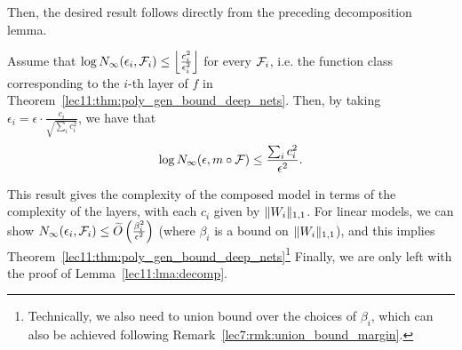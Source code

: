 Then, the desired result follows directly from the preceding decomposition lemma.
\begin{corollary} Assume that $\log N_\infty(\epsilon_i, \mathcal F_i) \leq \left \lfloor \frac{c_i^2}{\epsilon_i^2} \right \rfloor$ for every $\mathcal F_i$, i.e. the function class corresponding to the $i$-th layer of $f$ in Theorem~\ref{lec11:thm:poly_gen_bound_deep_nets}. Then, by taking $\epsilon_i = \epsilon \cdot \frac{c_i}{\sqrt{\sum_i c_i^2}}$, we have that
	\begin{equation}
	\log N_\infty(\epsilon, m \circ \mathcal F) \leq \frac{\sum_i c_i^2}{\epsilon^2}.
	\end{equation}
\end{corollary}
This result gives the complexity of the composed model in terms of the complexity of the layers, with each $c_i$ given by $\|W_i\|_{1, 1}$. For linear models, we can show $N_\infty(\epsilon_i, \mathcal F_i) \leq \widetilde{O}\left (\frac{\beta_i^2}{\epsilon^2} \right )$ (where $\beta_i$ is a bound on $\|W_i\|_{1, 1}$), and this implies Theorem~\ref{lec11:thm:poly_gen_bound_deep_nets}\footnote{Technically, we also need to union bound over the choices of $\beta_i$, which can also be achieved following Remark~\ref{lec7:rmk:union_bound_margin}.} Finally, we are only left with the proof of Lemma~\ref{lec11:lma:decomp}. 

